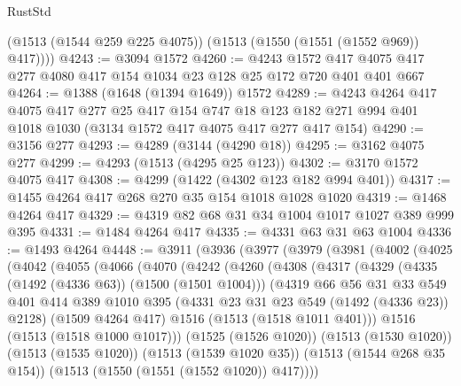 \begin{lexlean}{RustStd}
\begin{coremodule}
{\begin{coremodule}
{{{{{{{{        (@1513 (@1544 @259 @225 @4075))
        (@1513 (@1550 (@1551 (@1552 @969)) @417))))
@4243 := @3094 @1572
@4260 := @4243
    @1572
    @417
    @4075
    @417
    @277
    @4080
    @417
    @154
    @1034
    @23
    @128
    @25
    @172
    @720
    @401
    @401
    @667
@4264 := @1388 (@1648 (@1394 @1649)) @1572
@4289 := @4243
    @4264
    @417
    @4075
    @417
    @277
    @25
    @417
    @154
    @747
    @18
    @123
    @182
    @271
    @994
    @401
    @1018
    @1030
    (@3134 @1572 @417 @4075 @417 @277 @417 @154)
@4290 := @3156 @277
@4293 := @4289 (@3144 (@4290 @18))
@4295 := @3162 @4075 @277
@4299 := @4293 (@1513 (@4295 @25 @123))
@4302 := @3170 @1572 @4075 @417
@4308 := @4299 (@1422 (@4302 @123 @182 @994 @401))
@4317 := @1455 @4264 @417 @268 @270 @35 @154 @1018 @1028 @1020
@4319 := @1468 @4264 @417
@4329 := @4319 @82 @68 @31 @34 @1004 @1017 @1027 @389 @999 @395
@4331 := @1484 @4264 @417
@4335 := @4331 @63 @31 @63 @1004
@4336 := @1493 @4264
@4448 := @3911
    (@3936
      (@3977
        (@3979
          (@3981
            (@4002
              (@4025
                (@4042
                  (@4055
                    (@4066
                      (@4070
                        (@4242
                          (@4260
                            (@4308
                              (@4317
                                (@4329
                                  (@4335 (@1492 (@4336 @63)) (@1500 (@1501 @1004)))
                                  (@4319
                                    @66
                                    @56
                                    @31
                                    @33
                                    @549
                                    @401
                                    @414
                                    @389
                                    @1010
                                    @395
                                    (@4331 @23 @31 @23 @549 (@1492 (@4336 @23)) @2128)
                                    (@1509 @4264 @417)
                                    @1516
                                    (@1513 (@1518 @1011 @401)))
                                  @1516
                                  (@1513 (@1518 @1000 @1017)))
                                (@1525 (@1526 @1020))
                                (@1513 (@1530 @1020))
                                (@1513 (@1535 @1020))
                                (@1513 (@1539 @1020 @35))
                                (@1513 (@1544 @268 @35 @154))
                                (@1513 (@1550 (@1551 (@1552 @1020)) @417))))
}}}}}}}}
\end{coremodule}}
\end{coremodule}
\end{lexlean}
